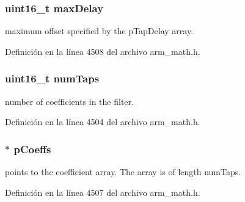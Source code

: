 \subsubsection[{\texorpdfstring{max\+Delay}{maxDelay}}]{\setlength{\rightskip}{0pt plus 5cm}uint16\+\_\+t max\+Delay}\hypertarget{structarm__fir__sparse__instance__q31_ab25f4ee7550e6d92acff77ada283733f}{}\label{structarm__fir__sparse__instance__q31_ab25f4ee7550e6d92acff77ada283733f}
maximum offset specified by the p\+Tap\+Delay array. 

Definición en la línea 4508 del archivo arm\+\_\+math.\+h.

\subsubsection[{\texorpdfstring{num\+Taps}{numTaps}}]{\setlength{\rightskip}{0pt plus 5cm}uint16\+\_\+t num\+Taps}\hypertarget{structarm__fir__sparse__instance__q31_a751941891e47f522a7f5375fe8990aac}{}\label{structarm__fir__sparse__instance__q31_a751941891e47f522a7f5375fe8990aac}
number of coefficients in the filter. 

Definición en la línea 4504 del archivo arm\+\_\+math.\+h.

\subsubsection[{\texorpdfstring{p\+Coeffs}{pCoeffs}}]{$\ast$ p\+Coeffs}\hypertarget{structarm__fir__sparse__instance__q31_a68888e36167d81cb7836db10367a1682}{}\label{structarm__fir__sparse__instance__q31_a68888e36167d81cb7836db10367a1682}
points to the coefficient array. The array is of length num\+Taps. 

Definición en la línea 4507 del archivo arm\+\_\+math.\+h.

